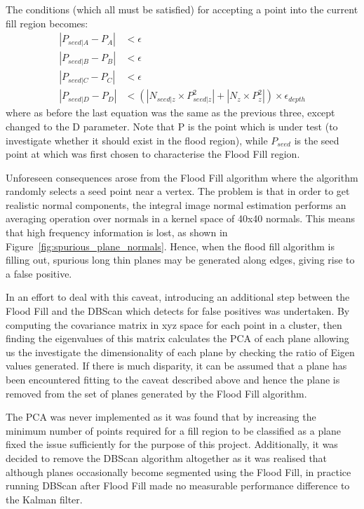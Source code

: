 \documentclass[]{article}
\begin{document}
{The conditions (which all must be satisfied) for accepting a point into the current fill region becomes:
\begin{align}
|P_{seed|A} - P_{A}| &< \epsilon \\
|P_{seed|B} - P_{B}| &< \epsilon\\
|P_{seed|C} - P_{C}| &< \epsilon\\
|P_{seed|D}-P_{D}| &< (|N_{seed|z} \times P^{2}_{seed|z}| + |N_{z} \times P^{2}_{z}|) \times \epsilon_{depth}
\end{align}
where as before the last equation was the same as the previous three, except changed to the D parameter.
Note that P is the point which is under test (to investigate whether it should exist in the flood region), while $P_{seed}$ is the seed point at which was first chosen to characterise the Flood Fill region. 

Unforeseen consequences arose from the Flood Fill algorithm where the algorithm randomly selects a seed point near a vertex. The problem is that in order to get realistic normal components, the integral image normal estimation performs an averaging operation over normals in a kernel space of 40x40 normals. This means that high frequency information is lost, as shown in Figure~\ref{fig:spurious_plane_normals}. Hence, when the flood fill algorithm is filling out, spurious long thin planes may be generated along edges, giving rise to a false positive. 

In an effort to deal with this caveat, introducing an additional step between the Flood Fill and the DBScan which detects for false positives was undertaken. By computing the covariance matrix in xyz space for each point in a cluster, then finding the eigenvalues of this matrix calculates the PCA of each plane allowing us the investigate the dimensionality of each plane by checking the ratio of Eigen values generated. If there is much disparity, it can be assumed that a plane has been encountered fitting to the caveat described above and hence the plane is removed from the set of planes generated by the Flood Fill algorithm. 

The PCA was never implemented as it was found that by increasing the minimum number of points required for a fill region to be classified as a plane fixed the issue sufficiently for the purpose of this project. Additionally, it was decided to remove the DBScan algorithm altogether as it was realised that although planes occasionally become segmented using the Flood Fill, in practice running DBScan after Flood Fill made no measurable performance difference to the Kalman filter.




}
\end{document}

